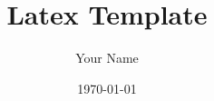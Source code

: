 \documentclass[
	12pt %
	,headings=normal %
]{scrreprt} %
\title{Latex Template}
\author{Your Name}
\date{\today}
\begin{document}
	\maketitle
	
	\blinddocument
\end{document}
